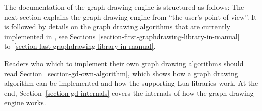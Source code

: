 The documentation of the graph drawing engine is structured as
follows: The next section explains the graph drawing engine from
``the user's point of view''.  It is followed by details on the
graph drawing algorithms that are currently implemented in \tikzname,
see Sections~\ref{section-first-graphdrawing-library-in-manual}
to~\ref{section-last-graphdrawing-library-in-manual}.

Readers who which to implement their own graph drawing algorithms
should read Section~\ref{section-gd-own-algorithm}, which shows how a
graph drawing algorithm can be implemented and how the supporting Lua
libraries work. At the end, Section~\ref{section-gd-internals} covers
the internals of how the graph drawing engine works.  


